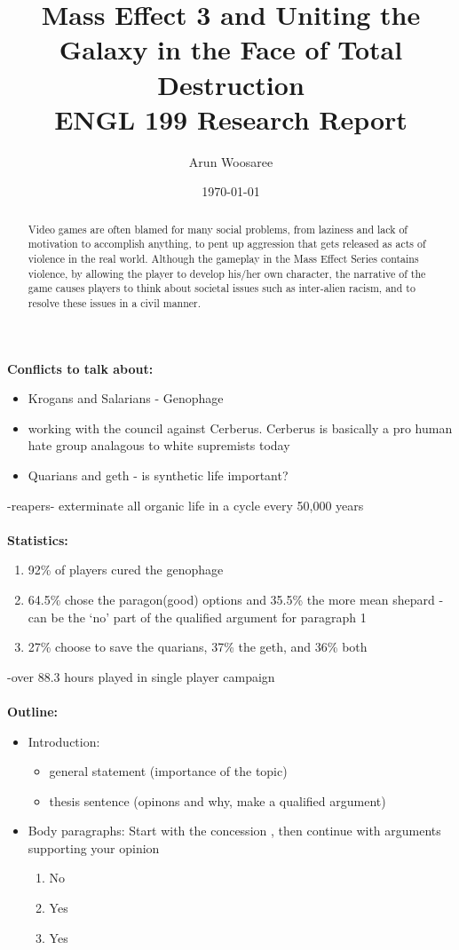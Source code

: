 \documentclass[journal]{IEEEtran}
\title{Mass Effect 3 and Uniting the Galaxy in the Face of Total Destruction\\
\vspace{.25cm}\large ENGL 199 Research Report \vspace{-.5cm}}
\author{\LARGE Arun Woosaree}
\date{\today}
\begin{document}
\maketitle %

\begin{abstract}
 Video games are often blamed for many social problems, from laziness and lack of motivation to accomplish anything, to pent up aggression that gets released as acts of violence in the real world. Although the gameplay in the Mass Effect Series contains violence, by allowing the player to develop his/her own character, the narrative of the game causes players to think about societal issues such as inter-alien racism, and to resolve these issues in a civil manner.
\end{abstract}

\textbf{Conflicts to talk about:}
\begin{itemize}
 \item Krogans and Salarians - Genophage
 \item working with the council against Cerberus. Cerberus is basically a pro human hate group analagous to white supremists today
 \item Quarians and geth - is synthetic life important?
\end{itemize}
-reapers- exterminate all organic life in a cycle every 50,000 years
\\ \\
\textbf{Statistics:}
\begin{enumerate}
 \item 92\% of players cured the genophage
 \item 64.5\% chose the paragon(good) options and 35.5\% the more mean shepard - can be the `no' part of the qualified argument for paragraph 1
 \item 27\% choose to save the quarians, 37\% the geth, and 36\% both
\end{enumerate}
-over 88.3 hours played in single player campaign
\\ \\
\textbf{Outline:}
\begin{itemize}
 \item Introduction:
       \begin{itemize}
        \item general statement (importance of the topic)
        \item thesis sentence (opinons and why, make a qualified argument)
       \end{itemize}
 \item Body paragraphs: Start with the concession , then continue with arguments supporting your opinion
       \begin{enumerate}
        \item No
        \item Yes
        \item Yes
       \end{enumerate}

\end{itemize}
\end{document}
